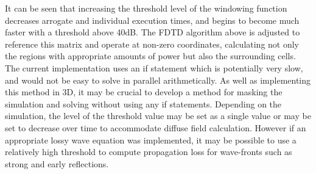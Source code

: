 It can be seen that increasing the threshold level of the windowing function decreases arrogate and individual execution times, and begins to become much faster with a threshold above 40dB.
The FDTD algorithm above is adjusted to reference this matrix and operate at non-zero coordinates, calculating not only the regions with appropriate amounts of power but also the surrounding cells. The current implementation uses an if statement which is potentially very slow, and would not be easy to solve in parallel arithmetically. As well as implementing this method in 3D, it may be crucial to develop a method for masking the simulation and solving without using any if statements. Depending on the simulation, the level of the threshold value may be set as a single value or may be set to decrease over time to accommodate diffuse field calculation. However if an appropriate lossy wave equation was implemented, it may be possible to use a relatively high threshold to compute propagation loss for wave-fronts such as strong and early reflections.\\












